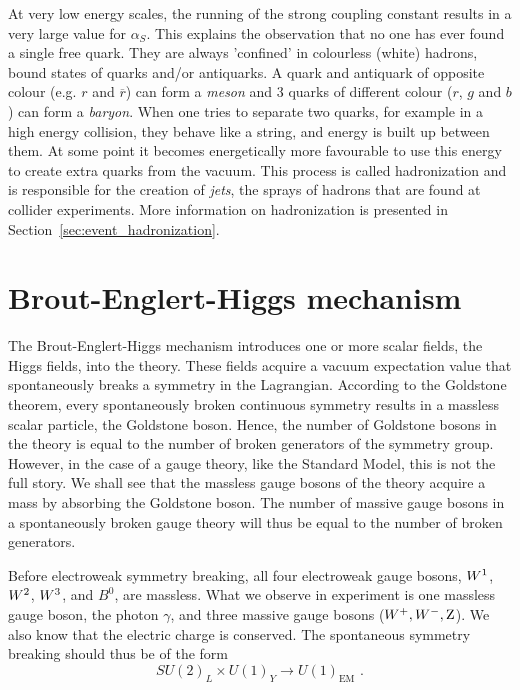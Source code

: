 At very low energy scales, the running of the strong coupling constant results in a very large
value for $\alpha_S$. This explains the observation that no one has ever found a single free quark. 
They are always 'confined' in colourless (white) hadrons, \ie bound states of quarks and/or
antiquarks.  A quark and antiquark of opposite colour (e.g. $r$ and $\overline{r}$) can form a
\textit{meson} and 3 quarks of different colour ($r$, $g$ and $b$) can form a \textit{baryon}. 
When one tries to separate two quarks, for example in a high energy collision, they behave like a
string, and energy is built up between them. At some point it becomes energetically more favourable
to use this energy to create extra quarks from the vacuum. 
This process is called hadronization and is responsible for the creation of \textsl{jets}, the
sprays of hadrons that are found at collider experiments. More information on hadronization is
presented in Section~\ref{sec:event_hadronization}.


\section{Brout-Englert-Higgs mechanism \label{sec:SM_HiggsMechanism}}

The Brout-Englert-Higgs mechanism introduces one or more scalar fields, the Higgs
fields, into the theory. These fields acquire a vacuum expectation value that spontaneously
breaks a symmetry in the Lagrangian. 
According to the Goldstone theorem, every spontaneously broken continuous symmetry
results in a massless scalar particle, the Goldstone boson. 
Hence, the number of Goldstone bosons in the theory is equal to the number of broken generators of
the symmetry group. 
However, in the case of a gauge theory, like the Standard Model, this is not the full story. 
We shall see that the massless gauge bosons of the theory acquire a mass by absorbing the Goldstone
boson. 
The number of massive gauge bosons in a spontaneously broken gauge theory will thus be equal to the
number of broken generators. 


Before electroweak symmetry breaking, all four electroweak gauge bosons, $W^1$, $W^2$, $W^3$,
and $B^0$, are massless. What we observe in experiment is one massless gauge boson, the photon
$\gamma$, and three massive gauge bosons ($W^+, W^-, \mathrm{Z}$). We also know that the electric charge
is conserved. The spontaneous symmetry breaking should thus be of the form
\begin{equation*}
  SU(2)_L \times U(1)_Y \rightarrow U(1)_{\text{EM}} \textrm{ .}
\end{equation*}

